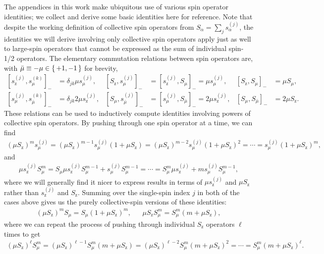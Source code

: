 \documentclass[pra,twocolumn,longbibliography]{revtex4-2}
\newcommand{\p}[1]{\left( #1 \right)} %
\renewcommand{\sp}[1]{\left[ #1 \right]} %
\newcommand{\z}{\text{z}}
\newcommand{\bmu}{{\bar\mu}}
\newcommand{\1}{\mathds{1}}
\renewcommand{\a}{\alpha} %
\begin{document}
The appendices in this work make ubiquitous use of various spin
operator identities; we collect and derive some basic identities here
for reference.  Note that despite the working definition of collective
spin operators from $S_\a=\sum_js_\a^{(j)}$, the identities we will
derive involving only collective spin operators apply just as well to
large-spin operators that cannot be expressed as the sum of individual
spin-1/2 operators.  The elementary commutation relations between spin
operators are, with $\bmu\equiv-\mu\in\set{+1,-1}$ for brevity,
\begin{align}
  \sp{s_\z^{(j)},s_\mu^{(k)}}_-
  &= \delta_{jk} \mu s_\mu^{(j)},
  &
  \sp{S_\z,s_\mu^{(j)}}_-
  &= \sp{s_\z^{(j)},S_\mu}_- = \mu s_\mu^{(j)},
  &
  \sp{S_\z,S_\mu}_-
  &= \mu S_\mu,
  \label{eq:comm_z_base} \\
  \sp{s_\mu^{(j)},s_\bmu^{(k)}}_-
  &= \delta_{jk} 2 \mu s_\z^{(j)},
  &
  \sp{S_\mu,s_\bmu^{(j)}}_-
  &= \sp{s_\mu^{(j)},S_\bmu}_- = 2 \mu s_\z^{(j)},
  &
  \sp{S_\mu,S_\bmu}_-
  &= 2 \mu S_\z.
  \label{eq:comm_mu_base}
\end{align}
These relations can be used to inductively compute identities
involving powers of collective spin operators.  By pushing through one
spin operator at a time, we can find
\begin{align}
  \p{\mu S_\z}^m s_\mu^{(j)}
  = \p{\mu S_\z}^{m-1} s_\mu^{(j)} \p{1 + \mu S_\z}
  = \p{\mu S_\z}^{m-2} s_\mu^{(j)} \p{1 + \mu S_\z}^2
  = \cdots
  = s_\mu^{(j)} \p{1 + \mu S_\z}^m,
  \label{eq:push_z_mu_Ss}
\end{align}
and
\begin{align}
  \mu s_\z^{(j)} S_\mu^m
  = S_\mu \mu s_\z^{(j)} S_\mu^{m-1} + s_\mu^{(j)} S_\mu^{m-1}
  = \cdots
  = S_\mu^m \mu s_\z^{(j)} + ms_\mu^{(j)} S_\mu^{m-1},
  \label{eq:push_z_mu_sS}
\end{align}
where we will generally find it nicer to express results in terms of
$\mu s_\z^{(j)}$ and $\mu S_\z$ rather than $s_\z^{(j)}$ and $S_\z$.
Summing over the single-spin index $j$ in both of the cases above
gives us the purely collective-spin versions of these identities:
\begin{align}
  \p{\mu S_\z}^m S_\mu = S_\mu \p{1 + \mu S_\z}^m,
  &&
  \mu S_\z S_\mu^m = S_\mu^m \p{m + \mu S_\z},
  \label{eq:push_z_mu_single}
\end{align}
where we can repeat the process of pushing through individual $S_\z$
operators $\ell$ times to get
\begin{align}
  \p{\mu S_\z}^\ell S_\mu^m
  = \p{\mu S_\z}^{\ell-1} S_\mu^m \p{m + \mu S_\z}
  = \p{\mu S_\z}^{\ell-2} S_\mu^m \p{m + \mu S_\z}^2
  = \cdots
  = S_\mu^m \p{m + \mu S_\z}^\ell.
  \label{eq:push_z_mu}
\end{align}
\end{document}
